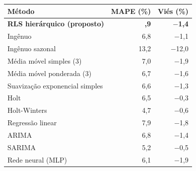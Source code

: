 \begin{tabular}{@{}lrr@{}}
\toprule
Método & MAPE (\%) & Viés (\%) \\
\midrule
\textbf{RLS hierárquico (proposto)} & \textbf{\boldmath 4,9} & \textbf{\boldmath $-$1,4} \\
Ingênuo & 6,8 & $-$1,1 \\
Ingênuo sazonal & 13,2 & $-$12,0 \\
Média móvel simples (3) & 7,0 & $-$1,9 \\
Média móvel ponderada (3) & 6,7 & $-$1,6 \\
Suavização exponencial simples & 6,6 & $-$1,3 \\
Holt & 6,5 & $-$0,3 \\
Holt-Winters & 4,7 & $-$0,6 \\
Regressão linear & 7,9 & $-$1,8 \\
ARIMA & 6,8 & $-$1,4 \\
SARIMA & 5,2 & $-$0,5 \\
Rede neural (MLP) & 6,1 & $-$1,9 \\
\bottomrule
\end{tabular}
